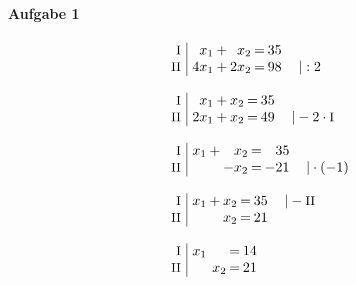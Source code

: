 
\paragraph{Aufgabe 1}
\begin{equation*}
\begin{array}{l}
\setlength{\arraycolsep}{1pt}
\begin{array}{r|rcrcrl}
   \text{\small I } &\;  x_{1} & + &  x_{2} & = & 35 &          \\
  \text{\small II } &\; 4x_{1} & + & 2x_{2} & = & 98 & \quad|:2   
\end{array}
\\ \\
\setlength{\arraycolsep}{1pt}
\begin{array}{r|rcrcrl}
   \text{\small I } &\;  x_{1} & + & x_{2} & = & 35 &                              \\
  \text{\small II } &\; 2x_{1} & + & x_{2} & = & 49 & \quad|-2\cdot\text{\small I}   
\end{array}
\\ \\
\setlength{\arraycolsep}{1pt}
\begin{array}{r|rcrcrl}
   \text{\small I } &\; x_{1} & + &  x_{2} & = &  35 &                 \\
  \text{\small II } &\;       &   & -x_{2} & = & -21 & \quad|\cdot(-1)   
\end{array}
\\ \\
\setlength{\arraycolsep}{1pt}
\begin{array}{r|rcrcrl}
   \text{\small I } &\; x_{1} & + & x_{2} & = & 35 & \quad|-\text{\small II} \\
  \text{\small II } &\;       &   & x_{2} & = & 21 &                           
\end{array}
\\ \\
\setlength{\arraycolsep}{1pt}
\begin{array}{r|rcrcrl}
   \text{\small I } &\; x_{1} &  &       & = & 14 & \\
  \text{\small II } &\;       &  & x_{2} & = & 21 &   
\end{array}
\end{array}
\end{equation*}
